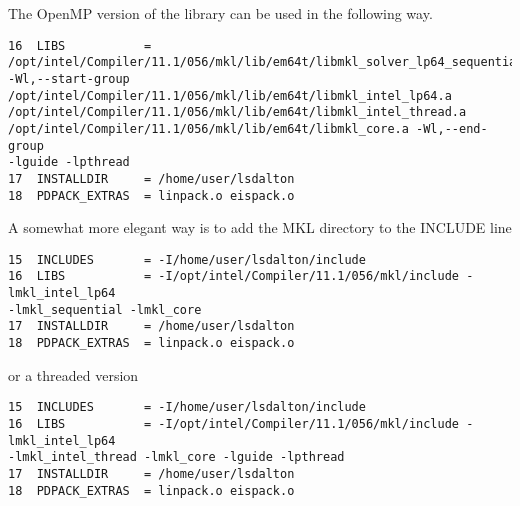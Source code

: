 The OpenMP version of the library can be used in the following way.
\begin{verbatim}
16  LIBS           = 
/opt/intel/Compiler/11.1/056/mkl/lib/em64t/libmkl_solver_lp64_sequential.a 
-Wl,--start-group /opt/intel/Compiler/11.1/056/mkl/lib/em64t/libmkl_intel_lp64.a 
/opt/intel/Compiler/11.1/056/mkl/lib/em64t/libmkl_intel_thread.a 
/opt/intel/Compiler/11.1/056/mkl/lib/em64t/libmkl_core.a -Wl,--end-group 
-lguide -lpthread
17  INSTALLDIR     = /home/user/lsdalton
18  PDPACK_EXTRAS  = linpack.o eispack.o
\end{verbatim}
A somewhat more elegant way is to add the MKL directory to the INCLUDE line 
\begin{verbatim}
15  INCLUDES       = -I/home/user/lsdalton/include
16  LIBS           = -I/opt/intel/Compiler/11.1/056/mkl/include -lmkl_intel_lp64 
-lmkl_sequential -lmkl_core
17  INSTALLDIR     = /home/user/lsdalton
18  PDPACK_EXTRAS  = linpack.o eispack.o
\end{verbatim}
or a threaded version
\begin{verbatim}
15  INCLUDES       = -I/home/user/lsdalton/include
16  LIBS           = -I/opt/intel/Compiler/11.1/056/mkl/include -lmkl_intel_lp64 
-lmkl_intel_thread -lmkl_core -lguide -lpthread
17  INSTALLDIR     = /home/user/lsdalton
18  PDPACK_EXTRAS  = linpack.o eispack.o
\end{verbatim}

